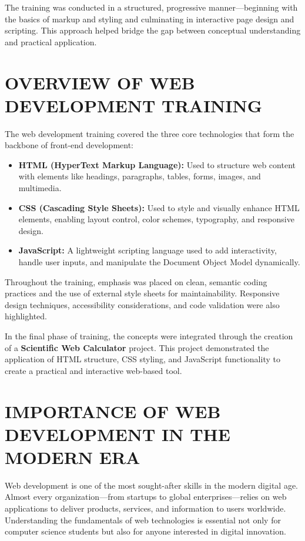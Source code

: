 \documentclass[a4paper,12pt,oneside]{report}
\numberwithin{equation}{chapter}
\numberwithin{figure}{chapter}
\numberwithin{table}{chapter}
\begin{document}
The training was conducted in a structured, progressive manner—beginning with the basics of markup and styling and culminating in interactive page design and scripting. This approach helped bridge the gap between conceptual understanding and practical application.

\section{OVERVIEW OF WEB DEVELOPMENT TRAINING}

The web development training covered the three core technologies that form the backbone of front-end development:

\begin{itemize}
    \item \textbf{HTML (HyperText Markup Language):} Used to structure web content with elements like headings, paragraphs, tables, forms, images, and multimedia.
    \item \textbf{CSS (Cascading Style Sheets):} Used to style and visually enhance HTML elements, enabling layout control, color schemes, typography, and responsive design.
    \item \textbf{JavaScript:} A lightweight scripting language used to add interactivity, handle user inputs, and manipulate the Document Object Model dynamically.
\end{itemize}

Throughout the training, emphasis was placed on clean, semantic coding practices and the use of external style sheets for maintainability. Responsive design techniques, accessibility considerations, and code validation were also highlighted. 

In the final phase of training, the concepts were integrated through the creation of a \textbf{Scientific Web Calculator} project. This project demonstrated the application of HTML structure, CSS styling, and JavaScript functionality to create a practical and interactive web-based tool.

\section{IMPORTANCE OF WEB DEVELOPMENT IN THE MODERN ERA}

Web development is one of the most sought-after skills in the modern digital age. Almost every organization—from startups to global enterprises—relies on web applications to deliver products, services, and information to users worldwide. Understanding the fundamentals of web technologies is essential not only for computer science students but also for anyone interested in digital innovation.
\end{document}
